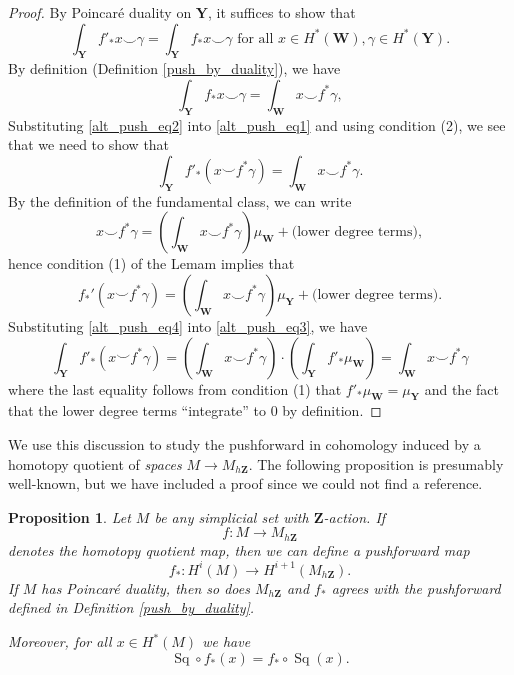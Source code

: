 \documentclass[10pt, reqno]{amsart}
\numberwithin{equation}{subsection}
\newcommand{\Z}{\mathbf{Z}}
\newcommand{\mbf}[1]{\mathbf{#1}}
\newcommand{\co}{\colon}
\DeclareMathOperator{\Sq}{Sq}
\newtheorem{prop}[thm]{Proposition}
\theoremstyle{remark}
\begin{document}
\begin{proof}
By Poincar\'{e} duality on $\mbf{Y}$, it suffices to show that 
\begin{equation}\label{alt_push_eq1}
\int_{\mbf{Y}} f'_* x \smile \gamma = \int_{\mbf{Y}} f_* x \smile \gamma \text{ for all } x \in H^*(\mbf{W}), \gamma \in H^*(\mbf{Y}).
\end{equation}
By definition (Definition \ref{push_by_duality}), we have
\begin{equation}\label{alt_push_eq2}
\int_{\mbf{Y}} f_* x \smile \gamma = \int_{\mbf{W}} x \smile f^* \gamma,
\end{equation}
Substituting \eqref{alt_push_eq2} into \eqref{alt_push_eq1} and using condition (2), we see that we need to show that 
\begin{equation}\label{alt_push_eq3}
\int_{\mbf{Y}} f'_*(x \smile f^* \gamma) = \int_{\mbf{W}} x \smile f^* \gamma.
\end{equation}
By the definition of the fundamental class, we can write 
\[
x \smile f^* \gamma = \left(\int_{\mbf{W}} x \smile f^* \gamma \right) \mu_{\mbf{W}} + \text{(lower degree terms)},
\]
hence condition (1) of the Lemam implies that 
\begin{equation}\label{alt_push_eq4}
f_*' (x \smile f^* \gamma ) =   \left(\int_{\mbf{W}} x \smile f^* \gamma \right) \mu_{\mbf{Y}} + \text{(lower degree terms)}.
\end{equation}
Substituting \eqref{alt_push_eq4} into \eqref{alt_push_eq3}, we have
\[
\int_{\mbf{Y}} f'_*(x \smile f^* \gamma)  = \left(\int_{\mbf{W}} x \smile f^* \gamma \right) \cdot \left(\int_{\mbf{Y}} f'_* \mu_{\mbf{W}}  \right) = \int_{\mbf{W}} x \smile f^* \gamma 
\]
where the last equality follows from condition (1) that $f'_* \mu_{\mbf{W}} = \mu_{\mbf{Y}}$ and the fact that the lower degree terms ``integrate'' to $0$ by definition.
\end{proof}


We use this discussion to study the pushforward in cohomology induced by a homotopy quotient of \emph{spaces} $M \rightarrow M_{h\Z}$. The following proposition is presumably well-known, but we have included a proof since we could not find a reference. 

\begin{prop}\label{Z space version}
Let $M$ be any simplicial set with $\Z$-action. If  
\[
f \colon M \rightarrow M_{h\Z}
\]
 denotes the homotopy quotient map, then we can define a pushforward map 
 \[
 f_* \co H^i(M)  \rightarrow H^{i+1}(M_{h\Z}).
 \]
If $M$ has Poincar\'{e} duality, then so does $M_{h\Z}$ and $f_*$ agrees with the pushforward defined in Definition \ref{push_by_duality}.
 
 Moreover, for all $x \in H^*(M)$ we have 
\[
\Sq \circ f_* (x) = f_* \circ \Sq (x).
\]
\end{prop}
\end{document}
